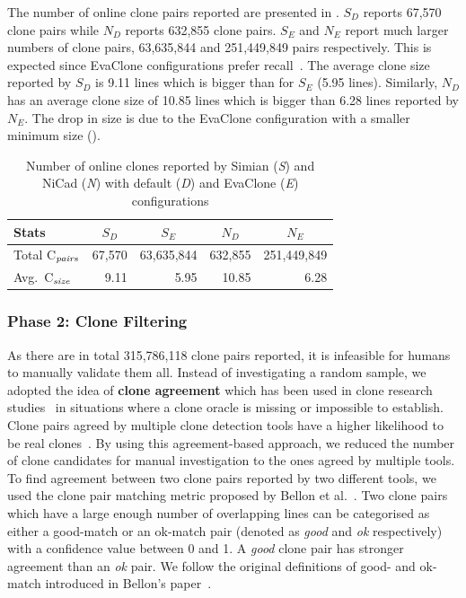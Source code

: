 \documentclass[sigconf,review, anonymous]{acmart}
\begin{document}
The number of online clone pairs reported %
are presented in . $S_D$ reports 67,570 clone
pairs while $N_D$ reports 632,855 clone pairs. $S_E$ and $N_E$ report
much larger numbers of clone pairs, 63,635,844 and 251,449,849 pairs
respectively. This is expected since EvaClone configurations prefer
recall~\cite{Wang2013}.  The average clone size reported by $S_D$ is
9.11 lines which is bigger than for $S_E$ (5.95 lines). Similarly,
$N_D$ has an average clone size of 10.85 lines which is bigger than
6.28 lines reported by $N_E$. The drop in size is due to the EvaClone
configuration with a smaller minimum size ().

\begin{table}
	\centering
	\caption{Number of online clones reported by Simian (\textit{S}) and NiCad (\textit{N}) with default (\textit{D}) and EvaClone (\textit{E}) configurations}
	\label{tab:orig_stats}
	\begin{tabular}{l|r|r|r|r}
		\hline
		Stats & \multicolumn{1}{c|}{$S_D$} & \multicolumn{1}{c|}{$S_E$} & \multicolumn{1}{c|}{$N_D$} & \multicolumn{1}{c}{$N_E$} \\
		\hline
		Total C$_{\textrm{\textit{pairs}}}$ & 67,570 & 63,635,844 & 632,855 & 251,449,849 \\
		Avg.~C$_{\textrm{\textit{size}}}$ & 9.11 & 5.95 & 10.85 & 6.28 \\
		\hline
	\end{tabular} %
\end{table}

\subsubsection{Phase 2: Clone Filtering}
As there are in total 315,786,118 clone pairs reported, it is
infeasible for humans to manually validate them all. Instead of
investigating a random sample, we adopted the idea of \textbf{clone
  agreement} which has been used in clone research
studies~\cite{Funaro2010, Wang2013,cr2016ssbse} in situations where a
clone oracle is missing or impossible to establish. Clone pairs agreed
by multiple clone detection tools have a higher likelihood to be real
clones~\cite{cr2016ssbse}. By using this agreement-based approach, we
reduced the number of clone candidates for manual investigation to the
ones agreed by multiple tools. To find agreement between two clone
pairs reported by two different tools, we used the clone pair matching
metric proposed by Bellon et al.~\cite{Bellon2007}. Two clone pairs
which have a large enough number of overlapping lines can be
categorised as either a good-match or an ok-match pair (denoted as
\textit{good} and \textit{ok} respectively) with a confidence value
between 0 and 1. A \textit{good} clone pair has stronger agreement
than an \textit{ok} pair. We follow the original definitions of good-
and ok-match introduced in Bellon's paper~\cite{Bellon2007}.
\end{document}
